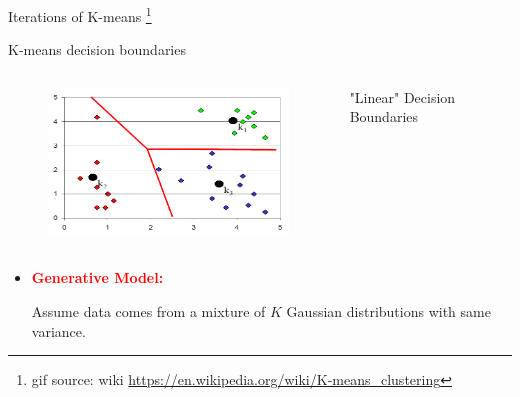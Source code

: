 \documentclass[12pt]{beamer}
\begin{document}
\begin{frame}{Iterations of K-means \footnote{\scriptsize{gif source: wiki \url{https://en.wikipedia.org/wiki/K-means_clustering}}}}
\begin{figure}
\end{figure}
\end{frame}

\begin{frame}{K-means decision boundaries}
\begin{columns}[c]
\column{8cm}
\begin{figure}
\includegraphics[width=7cm]{pics/kmean_decision_boundaries}
\end{figure}
\column{3cm}
"Linear" Decision Boundaries
\end{columns}
\begin{itemize}
	\item \textbf{\textcolor{red}{Generative Model:}}

	Assume data comes from a mixture of $K$ Gaussian distributions
	with same variance.
\end{itemize}
\end{frame}
\end{document}
